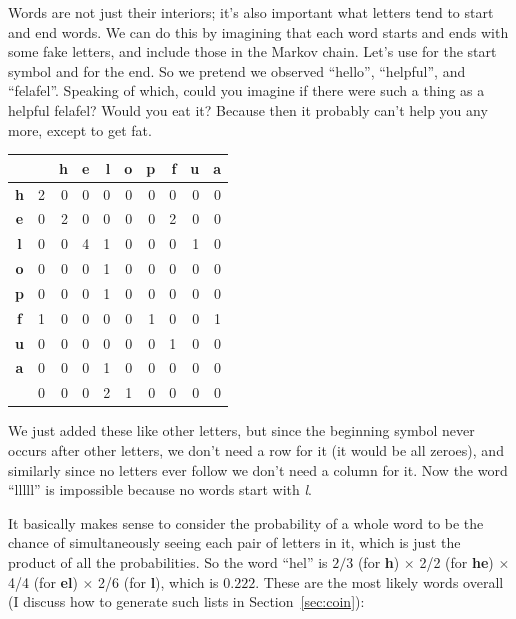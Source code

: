 \documentclass[twocolumn]{article}
\begin{document}
Words are not just their interiors; it's also important what letters
tend to start and end words. We can do this by imagining that each
word starts and ends with some fake letters, and include those in the
Markov chain. Let's use {\bf \<} for the start symbol and {\bf \>} for
the end. So we pretend we observed ``\<hello\>'', ``\<helpful\>'', and
``\<felafel\>''. Speaking of which, could you imagine if there were such
a thing as a helpful felafel? Would you eat it? Because then it
probably can't help you any more, except to get fat.

\begin{center}
\begin{tabular}{|c|r|r|r|r|r|r|r|r|r|} %
\hline
\,  &  {\bf \<}    & {\bf h}   & {\bf e}   & {\bf l}   & {\bf o}   & {\bf p}   & {\bf f}   & {\bf u}   & {\bf a}    \\
\hline  %
{\bf h} &  2  &  0   & 0   & 0   & 0   & 0   & 0   & 0   & 0    \\
\hline    
{\bf e} &  0  &  2   & 0   & 0   & 0   & 0   & 2   & 0   & 0    \\
\hline    
{\bf l} &  0  &  0   & 4   & 1   & 0   & 0   & 0   & 1   & 0    \\
\hline    
{\bf o} &  0  &  0   & 0   & 1   & 0   & 0   & 0   & 0   & 0    \\
\hline    
{\bf p} &  0  &  0   & 0   & 1   & 0   & 0   & 0   & 0   & 0    \\
\hline    
{\bf f} &  1  &  0   & 0   & 0   & 0   & 1   & 0   & 0   & 1    \\
\hline    
{\bf u} &  0  &  0   & 0   & 0   & 0   & 0   & 1   & 0   & 0    \\
\hline    
{\bf a} &  0  &  0   & 0   & 1   & 0   & 0   & 0   & 0   & 0    \\
\hline    
{\bf \>} &  0  &  0   & 0   & 2   & 1   & 0   & 0   & 0   & 0    \\
\hline
\end{tabular}
\end{center}

We just added these like other letters, but since the beginning symbol
{\bf \<} never occurs after other letters, we don't need a row for it
(it would be all zeroes), and similarly since no letters ever follow
{\bf \>} we don't need a column for it. Now the word ``lllll'' is
impossible because no words start with {\it l}.

It basically makes sense to consider the probability of a whole word
to be the chance of simultaneously seeing each pair of letters in it,
which is just the product of all the probabilities. So the word
``hel'' is $2/3$ (for {\bf \<h}) $\times$ 2/2 (for {\bf he}) $\times$
4/4 (for {\bf el}) $\times$ 2/6 (for {\bf l\>}), which is $0.222$.
These are the most likely words overall (I discuss how to generate
such lists in Section~\ref{sec:coin}):
\end{document}
